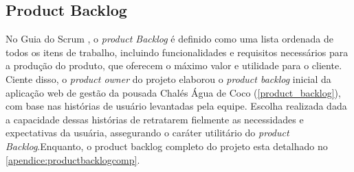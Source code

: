 \documentclass[
	12pt,				%
	openany,			%
	oneside,			%
	a4paper,			%
	english,			%
	french,				%
	spanish,			%
	brazil				%
	]{abntex2}
\begin{document}
\subsection{Product Backlog}
No Guia do Scrum \cite{scrumguide}, o \textit{product Backlog} é definido como uma lista ordenada de todos os itens de trabalho, incluindo funcionalidades e requisitos necessários para a produção do produto, que oferecem o máximo valor e utilidade para o cliente. Ciente disso, o \textit{product owner} do projeto elaborou o \textit{product backlog} inicial da aplicação web de gestão da pousada Chalés Água de Coco (\autoref{product_backlog}), com base nas histórias de usuário levantadas pela equipe.  Escolha realizada dada a capacidade dessas histórias de retratarem fielmente as necessidades e expectativas da usuária,  assegurando o caráter utilitário do \textit{product Backlog}.Enquanto, o product backlog completo do projeto esta detalhado no \autoref{apendice:productbacklogcomp}.
%
\end{document}
